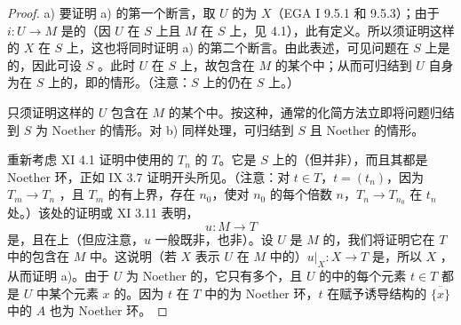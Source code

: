 \begin{proof}
a) 要证明 a) 的第一个断言，取 $U$ 的为 $X$（EGA I 9.5.1 和 9.5.3）；由于 $i:U\to M$ 是的（因 $U$ 在 $S$ 上且 $M$ 在 $S$ 上，见 4.1），此有定义。所以须证明这样的 $X$ 在 $S$ 上，这也将同时证明 a) 的第二个断言。由此表述，可见问题在 $S$ 上是的，因此可设 $S$ 。此时 $U$ 在 $S$ 上，故包含在 $M$ 的某个中；从而可归结到 $U$ 自身为在 $S$ 上的，即的情形。（注意：$S$ 上的仍在 $S$ 上。）

只须证明这样的 $U$ 包含在 $M$ 的某个中。按这种，通常的化简方法立即将问题归结到 $S$ 为 Noether 的情形。对 b) 同样处理，可归结到 $S$ 且 Noether 的情形。

重新考虑 XI 4.1 证明中使用的 $T_n$ 的 $T$。它是 $S$ 上的（但并非），而且其都是 Noether 环，正如 IX 3.7 证明开头所见。（注意：对 $t\in T$，$t=(t_n)$，因为 $T_m\to T_n$ ，且 $T_m$ 的有上界，存在 $n_0$，使对 $n_0$ 的每个倍数 $n$，$T_n\to T_{n_0}$ 在 $t_n$ 处。）该处的证明或 XI 3.11 表明，
\[u:M\longrightarrow T\]
是，且在上（但应注意，$u$ 一般既非，也非）。设 $U$ 是 $M$ 的，我们将证明它在 $T$ 中的包含在 $M$ 中。这说明（若 $X$ 表示 $U$ 在 $M$ 中的）$u|_X:X\to T$ 是，所以 $X$
，从而证明 a)。由于 $U$ 为 Noether 的，它只有多个，且 $U$ 的中的每个元素 $t\in T$ 都是 $U$ 中某个元素 $x$ 的。因为 $t$ 在 $T$ 中的为 Noether 环，$t$ 在赋予诱导结构的 $\overline{\{x\}}$ 中的 $A$ 也为 Noether 环。


\end{proof}
